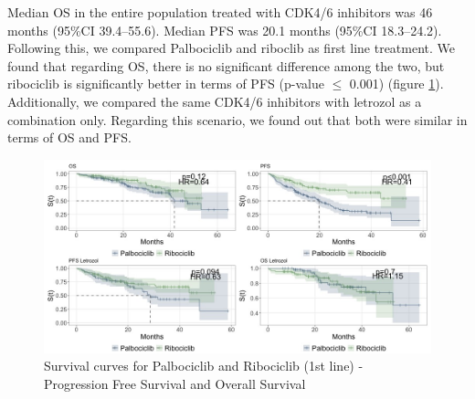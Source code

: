  Median OS in the entire population treated with CDK4/6 inhibitors was 46 months (95\%CI 39.4–55.6). Median PFS was 20.1 months (95\%CI 18.3–24.2). 
Following this, we compared Palbociclib and riboclib as first line treatment. We found that regarding OS, there is no significant difference among the two, but ribociclib is significantly better in terms of PFS (p-value $\le$ 0.001) (figure \ref*{fig:interest}).
Additionally, we compared the same CDK4/6 inhibitors with letrozol as a combination only. Regarding this scenario, we found out that both were similar in terms of OS and PFS.



\begin{figure}[ht]
  \caption{Survival curves for Palbociclib and Ribociclib (1st line) - Progression Free Survival and Overall Survival}\label{fig:interest} 
  \includegraphics[scale=0.45]{figures/interest_curve_both.jpeg}%

\end{figure}


